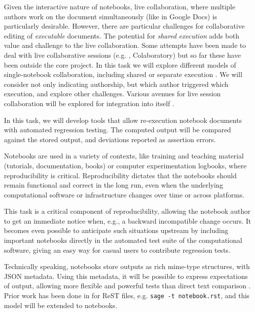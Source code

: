 \begin{workpackage}
\begin{tasklist}
\begin{task}[id=notebook-collab,title=Notebook improvements for collaboration,lead=SR, partners={PS,USH,JU,USO}, PM=18, wphases=0-24]
  Given the interactive nature of \Jupyter notebooks, live
  collaboration, where multiple authors work on the document
  simultaneously (like in Google Docs) is particularly
  desirable. However, there are particular challenges for
  collaborative editing of \emph{executable} documents. The potential
  for \emph{shared execution} adds both value and challenge to the
  live collaboration. Some attempts have been made to deal with live
  collaborative sessions (e.g. \SMC, Colaboratory) but so far these
  have been outside the core \Jupyter project. In this task we will
  explore different models of single-notebook collaboration, including
  shared or separate execution . We will
  consider not only indicating authorship, but which author
  triggered which execution, and explore other challenges.  Various
  avenues for live session collaboration will be explored for
  integration into \Jupyter itself
  .
\end{task}

\begin{task}[id=notebook-verification,title=Reproducible Notebooks,lead=SR, partners={PS,USO}, PM=4, wphases=12-24]
  In this task, we will develop tools that allow re-execution
  notebook documents with automated regression testing. The computed
  output will be compared against the stored output, and deviations
  reported as assertion errors.

  Notebooks are used in a variety of contexts, like training and
  teaching material (tutorials, documentation, books) or computer
  experimentation logbooks, where reproducibility is
  critical. Reproducibility dictates that the notebooks should remain
  functional and correct in the long run, even when the underlying
  computational software or infrastructure changes over time or across
  platforms.

  This task is a critical component of reproducibility, allowing the
  notebook author to get an immediate notice when, e.g., a backward
  incompatible change occurs. It becomes even possible to anticipate
  such situations upstream by including important notebooks directly
  in the automated test suite of the computational software, giving an
  easy way for casual users to contribute regression tests.

  Technically speaking, \Jupyter notebooks store outputs as rich
  mime-type structures, with JSON metadata. Using this metadata, it
  will be possible to express expectations of output, allowing more
  flexible and powerful tests than direct text comparison
  .  Prior work has been done in \Sage for
  ReST files, e.g. \lstinline{sage -t notebook.rst}, and this model
  will be extended to notebooks.
\end{task}


\end{tasklist}
\end{workpackage}
